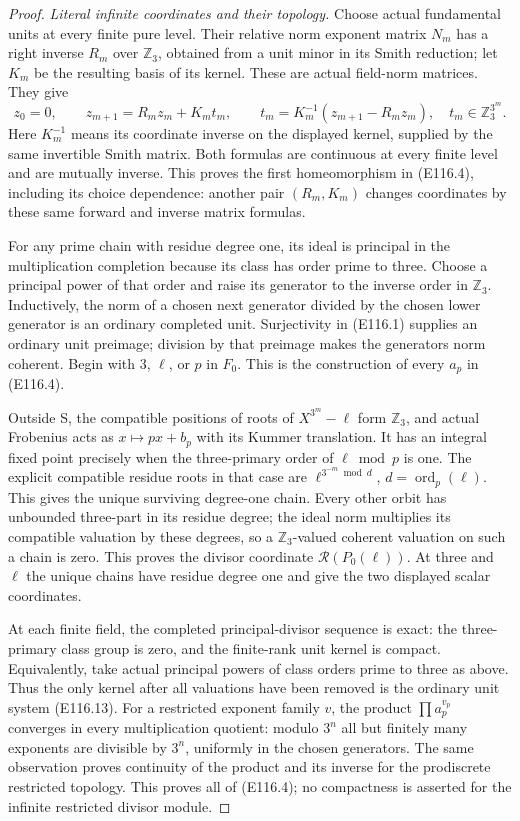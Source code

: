 \begin{proof}
\emph{Literal infinite coordinates and their topology.}
Choose actual fundamental units at every finite pure level.
Their relative norm exponent matrix $N_m$ has a right inverse
$R_m$ over $\mathbb Z_3$, obtained from a unit minor in its
Smith reduction; let $K_m$ be the resulting basis of its
kernel. These are actual field-norm matrices. They give
\[
 z_0=0,\qquad z_{m+1}=R_m z_m+K_m t_m,
 \qquad
 t_m=K_m^{-1}(z_{m+1}-R_mz_m),
 \quad t_m\in\mathbb Z_3^{3^m}.
 \tag{E116.13}
\]
Here $K_m^{-1}$ means its coordinate inverse on the displayed
kernel, supplied by the same invertible Smith matrix.
Both formulas are continuous at every finite level and
are mutually inverse. This proves the first homeomorphism
in (E116.4), including its choice dependence: another
pair $(R_m,K_m)$ changes coordinates by these same forward
and inverse matrix formulas.

For any prime chain with residue degree one, its ideal is
principal in the multiplication completion because its
class has order prime to three. Choose a principal power
of that order and raise its generator to the inverse
order in $\mathbb Z_3$.
Inductively, the norm of a chosen next generator divided
by the chosen lower generator is an ordinary completed
unit. Surjectivity in (E116.1) supplies an ordinary unit
preimage; division by that preimage makes the generators
norm coherent. Begin with $3$, $\ell$, or $p$ in $F_0$.
This is the construction of every $a_p$ in (E116.4).

Outside S, the compatible positions of roots of
$X^{3^m}-\ell$ form $\mathbb Z_3$, and actual Frobenius
acts as $x\mapsto p x+b_p$ with its Kummer translation.
It has an integral fixed point precisely when the
three-primary order of $\ell\bmod p$ is one. The explicit
compatible residue roots in that case are
$\ell^{3^{-m}\bmod d}$, $d=\operatorname{ord}_p(\ell)$.
This gives the unique surviving degree-one chain.
Every other orbit has unbounded three-part in its residue
degree; the ideal norm multiplies its compatible valuation
by these degrees, so a $\mathbb Z_3$-valued coherent
valuation on such a chain is zero. This proves the
divisor coordinate $\mathcal R(P_0(\ell))$.
At three and $\ell$ the unique chains have residue degree
one and give the two displayed scalar coordinates.

At each finite field, the completed principal-divisor
sequence is exact: the three-primary class group is zero,
and the finite-rank unit kernel is compact. Equivalently,
take actual principal powers of class orders prime to
three as above. Thus the only kernel after all valuations
have been removed is the ordinary unit system (E116.13).
For a restricted exponent family $v$, the product
$\prod a_p^{v_p}$ converges in every multiplication
quotient: modulo $3^n$ all but finitely many exponents
are divisible by $3^n$, uniformly in the chosen generators.
The same observation proves continuity of the product
and its inverse for the prodiscrete restricted topology.
This proves all of (E116.4); no compactness is asserted
for the infinite restricted divisor module.


\end{proof}
